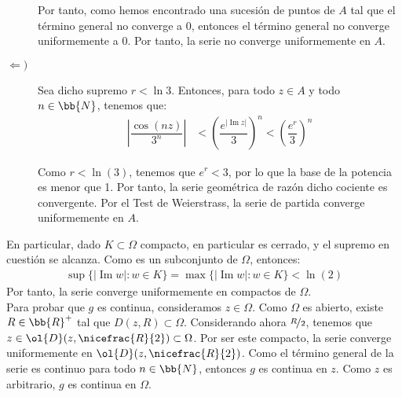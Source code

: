 \documentclass[12pt]{article}
\renewcommand{\Im}{\operatorname{Im}}
\begin{document}
\begin{ejercicio}[4 puntos]
\begin{description}
            Por tanto, como hemos encontrado una sucesión de puntos de $A$ tal que el término general no converge a $0$, entonces el término general no converge uniformemente a $0$. Por tanto, la serie no converge uniformemente en $A$.

            \item[$\Longleftarrow)$] Sea dicho supremo $r<\ln 3$. Entonces, para todo $z\in A$ y todo $n\in \bb{N}$, tenemos que:
            \begin{align*}
                \left|\dfrac{\cos(nz)}{3^n}\right| &<\left(\dfrac{e^{|\Im z|}}{3}\right)^n
                < \left(\dfrac{e^{r}}{3}\right)^n
            \end{align*}

            Como $r<\ln(3)$, tenemos que $e^{r}<3$, por lo que la base de la potencia es menor que 1. Por tanto, la serie geométrica de razón dicho cociente es convergente. Por el Test de Weierstrass, la serie de partida converge uniformemente en $A$.
        \end{description}

        En particular, dado $K\subset \Omega$ compacto, en particular es cerrado, y el supremo en cuestión se alcanza. Como es un subconjunto de $\Omega$, entonces:
        \begin{align*}
            \sup\{|\Im w| : w\in K\}=\max\{|\Im w| : w\in K\} < \ln(2)
        \end{align*}
        Por tanto, la serie converge uniformemente en compactos de $\Omega$.\\

        Para probar que $g$ es continua, consideramos $z\in \Omega$. Como $\Omega$ es abierto, existe $R\in \bb{R}^+$ tal que $D(z,R)\subset \Omega$. Considerando ahora $\nicefrac{R}{2}$, tenemos que $z\in \ol{D}(z,\nicefrac{R}{2})\subset \Omega$. Por ser este compacto, la serie converge uniformemente en $\ol{D}(z,\nicefrac{R}{2})$. Como el término general de la serie es continuo para todo $n\in \bb{N}$, entonces $g$ es continua en $z$. Como $z$ es arbitrario, $g$ es continua en $\Omega$.\\


\end{ejercicio}
\end{document}
